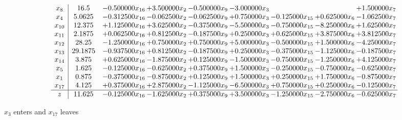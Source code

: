 \documentclass[10pt]{article}
\begin{document}
 \[\begin{array}{c| c c@{\hskip 2pt} c@{\hskip 2pt} c@{\hskip 2pt} c@{\hskip 2pt} c@{\hskip 2pt} c@{\hskip 2pt} c@{\hskip 2pt} }
 x_{8}   &  16.5 & -0.500000 x_{16} & + 3.500000 x_{2} & -0.500000 x_{9} & -3.000000 x_{3} &    &   & + 1.500000 x_{7}\\
 x_{4}   &  5.0625 & -0.312500 x_{16} & -0.062500 x_{2} & -0.062500 x_{9} & + 0.750000 x_{3} & -0.125000 x_{15} & + 0.625000 x_{6} & -1.062500 x_{7}\\
 x_{10}   &  12.375 & + 1.125000 x_{16} & + 3.625000 x_{2} & -0.375000 x_{9} & -5.500000 x_{3} & -0.750000 x_{15} & -8.250000 x_{6} & + 1.625000 x_{7}\\
 x_{11}   &  2.1875 & + 0.062500 x_{16} & + 0.812500 x_{2} & -0.187500 x_{9} & + 0.250000 x_{3} & + 0.625000 x_{15} & + 3.875000 x_{6} & + 3.812500 x_{7}\\
 x_{12}   &  28.25 & -1.250000 x_{16} & + 0.750000 x_{2} & + 0.750000 x_{9} & + 5.000000 x_{3} & -0.500000 x_{15} & + 1.500000 x_{6} & -4.250000 x_{7}\\
 x_{13}   &  29.1875 & -0.937500 x_{16} & + 0.812500 x_{2} & -0.187500 x_{9} & + 0.250000 x_{3} & -0.375000 x_{15} & -1.125000 x_{6} & -0.187500 x_{7}\\
 x_{14}   &  3.875 & + 0.625000 x_{16} & -1.875000 x_{2} & + 0.125000 x_{9} & -1.500000 x_{3} & -0.750000 x_{15} & -1.250000 x_{6} & + 4.125000 x_{7}\\
 x_{5}   &  1.625 & -0.125000 x_{16} & -0.625000 x_{2} & + 0.375000 x_{9} & + 1.500000 x_{3} & -0.250000 x_{15} & -0.750000 x_{6} & -0.625000 x_{7}\\
 x_{1}   &  0.875 & -0.375000 x_{16} & -0.875000 x_{2} & + 0.125000 x_{9} & + 1.500000 x_{3} & + 0.250000 x_{15} & + 1.750000 x_{6} & -0.875000 x_{7}\\
 x_{17}   &  4.125 & + 0.375000 x_{16} & + 2.875000 x_{2} & -1.125000 x_{9} & -6.500000 x_{3} & + 0.750000 x_{15} & + 0.250000 x_{6} & -0.125000 x_{7}\\
\hline
z    &  11.625 & -0.125000 x_{16} & -1.625000 x_{2} & + 0.375000 x_{9} & + 3.500000 x_{3} & -1.250000 x_{15} & -2.750000 x_{6} & -0.625000 x_{7}\\
\end{array}\]


 $ x_{3} $ enters and $ x_{17} $ leaves 
\end{document}
